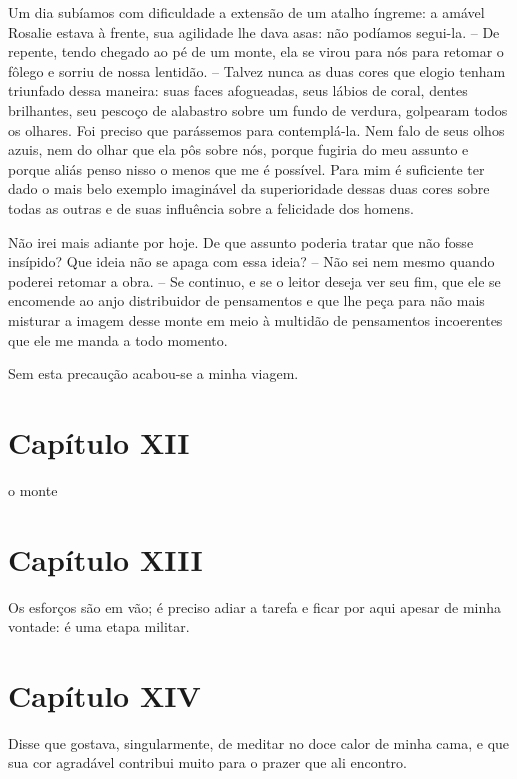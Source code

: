  Um dia subíamos com dificuldade a extensão de um atalho íngreme: a
amável Rosalie estava à frente, sua agilidade lhe dava asas: não
podíamos segui-la. -- De repente, tendo chegado ao pé de um monte, ela
se virou para nós para retomar o fôlego e sorriu de nossa lentidão. --
Talvez nunca as duas cores que elogio tenham triunfado dessa maneira:
suas faces afogueadas, seus lábios de coral, dentes brilhantes, seu
pescoço de alabastro sobre um fundo de verdura, golpearam todos os
olhares. Foi preciso que parássemos para contemplá-la. Nem falo de seus
olhos azuis, nem do olhar que ela pôs sobre nós, porque fugiria do meu
assunto e porque aliás penso nisso o menos que me é possível. Para mim
é suficiente ter dado o mais belo exemplo imaginável da superioridade
dessas duas cores sobre todas as outras e de suas influência sobre a
felicidade dos homens.

 Não irei mais adiante por hoje. De que assunto poderia tratar que não
fosse insípido? Que ideia não se apaga com essa ideia? -- Não sei nem
mesmo quando poderei retomar a obra. -- Se continuo, e se o leitor
deseja ver seu fim, que ele se encomende ao anjo distribuidor de
pensamentos e que lhe peça para não mais misturar a imagem desse monte
em meio à multidão de pensamentos incoerentes que ele me manda a todo
momento. 

 Sem esta precaução acabou-se a minha viagem.

\section{Capítulo XII}

\noindent\dotfill

\noindent o monte

\noindent\dotfill

\section{Capítulo XIII}

 Os esforços são em vão; é preciso adiar a tarefa e ficar por aqui
apesar de minha vontade: é uma etapa militar.

\section{Capítulo XIV}

Disse que gostava, singularmente, de meditar no doce calor de minha
cama, e que sua cor agradável contribui muito para o prazer que ali
encontro.

